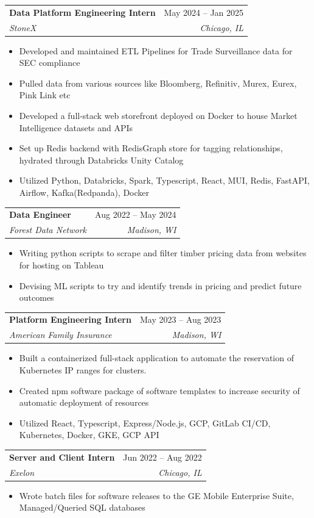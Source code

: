 \documentclass[letterpaper,11pt]{article}
\makeatletter
\newcommand{\resumeItem}[1]{
  \item\small{
    {#1 \vspace{-2pt}}
  }
}
\newcommand{\resumeSubheading}[4]{
  \vspace{-2pt}\item
    \begin{tabular*}{0.97\textwidth}[t]{l@{\extracolsep{\fill}}r}
      \textbf{#1} & #2 \\
      \textit{\small#3} & \textit{\small #4} \\
    \end{tabular*}\vspace{-7pt}
}
\newcommand{\resumeSubSubheading}[2]{
    \item
    \begin{tabular*}{0.97\textwidth}{l@{\extracolsep{\fill}}r}
      \textit{\small#1} & \textit{\small #2} \\
    \end{tabular*}\vspace{-7pt}
}
\newcommand{\resumeSubHeadingListEnd}{\end{itemize}}
\newcommand{\resumeItemListStart}{\begin{itemize}}
\newcommand{\resumeItemListEnd}{\end{itemize}\vspace{-5pt}}
\makeatother
\begin{document}
    \resumeSubheading
      {Data Platform Engineering Intern}{May 2024 -- Jan 2025}
      {StoneX}{Chicago, IL}
      \resumeItemListStart
        \resumeItem{Developed and maintained ETL Pipelines for Trade Surveillance data for SEC compliance}
        \resumeItem{Pulled data from various sources like Bloomberg, Refinitiv, Murex, Eurex, Pink Link etc}
        \resumeItem{Developed a full-stack web storefront deployed on Docker to house Market Intelligence datasets and APIs}
        \resumeItem{Set up Redis backend with RedisGraph store for tagging relationships, hydrated through Databricks Unity Catalog}
        \resumeItem{Utilized Python, Databricks, Spark, Typescript, React, MUI, Redis, FastAPI, Airflow, Kafka(Redpanda), Docker}
      \resumeItemListEnd

      

    \resumeSubheading
      {Data Engineer}{Aug 2022 -- May 2024}
      {Forest Data Network}{Madison, WI}
      \resumeItemListStart
        \resumeItem{Writing python scripts to scrape and filter timber pricing data from websites for hosting on Tableau}
        \resumeItem{Devising ML scripts to try and identify trends in pricing and predict future outcomes}
    \resumeItemListEnd

    \resumeSubheading
      {Platform Engineering Intern}{May 2023 -- Aug 2023}
      {American Family Insurance}{Madison, WI}
      \resumeItemListStart
        \resumeItem{Built a containerized full-stack application to automate the reservation of Kubernetes IP ranges for clusters.}
        \resumeItem{Created npm software package of software templates to increase security of automatic deployment of resources}
        \resumeItem{Utilized React, Typescript, Express/Node.js, GCP, GitLab CI/CD, Kubernetes, Docker, GKE, GCP API}
      \resumeItemListEnd

    \resumeSubheading
      {Server and Client Intern}{Jun 2022 -- Aug 2022}
      {Exelon}{Chicago, IL}
      \resumeItemListStart
        \resumeItem{Wrote batch files for software releases to the GE Mobile Enterprise Suite, Managed/Queried SQL databases}
      \resumeItemListEnd
      
\end{document}
